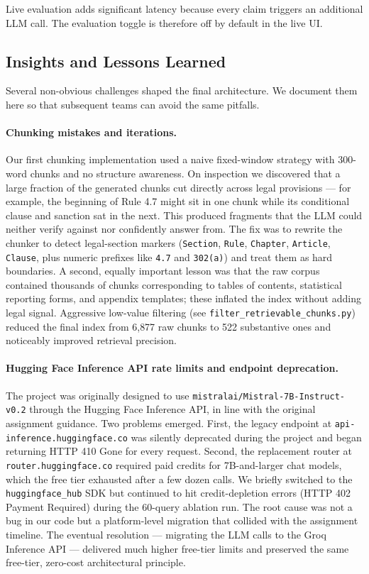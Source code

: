 \documentclass[11pt,a4paper]{article}
\begin{document}
Live evaluation adds significant latency because every claim triggers an additional LLM call. The evaluation toggle is therefore off by default in the live UI.

\subsection{Insights and Lessons Learned}
\label{sec:insights}

Several non-obvious challenges shaped the final architecture. We document them here so that subsequent teams can avoid the same pitfalls.

\paragraph{Chunking mistakes and iterations.}
Our first chunking implementation used a naive fixed-window strategy with 300-word chunks and no structure awareness. On inspection we discovered that a large fraction of the generated chunks cut directly across legal provisions --- for example, the beginning of Rule 4.7 might sit in one chunk while its conditional clause and sanction sat in the next. This produced fragments that the LLM could neither verify against nor confidently answer from. The fix was to rewrite the chunker to detect legal-section markers (\texttt{Section}, \texttt{Rule}, \texttt{Chapter}, \texttt{Article}, \texttt{Clause}, plus numeric prefixes like \texttt{4.7} and \texttt{302(a)}) and treat them as hard boundaries. A second, equally important lesson was that the raw corpus contained thousands of chunks corresponding to tables of contents, statistical reporting forms, and appendix templates; these inflated the index without adding legal signal. Aggressive low-value filtering (see \texttt{filter\_retrievable\_chunks.py}) reduced the final index from 6{,}877 raw chunks to 522 substantive ones and noticeably improved retrieval precision.

\paragraph{Hugging Face Inference API rate limits and endpoint deprecation.}
The project was originally designed to use \texttt{mistralai/Mistral-7B-Instruct-v0.2} through the Hugging Face Inference API, in line with the original assignment guidance. Two problems emerged. First, the legacy endpoint at \texttt{api-inference.huggingface.co} was silently deprecated during the project and began returning HTTP 410 Gone for every request. Second, the replacement router at \texttt{router.huggingface.co} required paid credits for 7B-and-larger chat models, which the free tier exhausted after a few dozen calls. We briefly switched to the \texttt{huggingface\_hub} SDK but continued to hit credit-depletion errors (HTTP 402 Payment Required) during the 60-query ablation run. The root cause was not a bug in our code but a platform-level migration that collided with the assignment timeline. The eventual resolution --- migrating the LLM calls to the Groq Inference API --- delivered much higher free-tier limits and preserved the same free-tier, zero-cost architectural principle.
\end{document}
